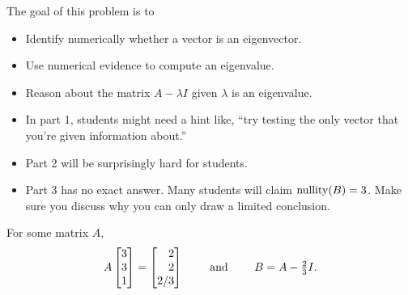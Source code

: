 	\bookonlynewpage
	\question
	\begin{annotation}
		\begin{goals}

			The goal of this problem is to
			\begin{itemize}
				\item Identify numerically whether a vector is an eigenvector.
				\item Use numerical evidence to compute an eigenvalue.
				\item Reason about the matrix $A-\lambda I$ given $\lambda$ is an eigenvalue.
			\end{itemize}
		\end{goals}

		\begin{notes}
			\begin{itemize}
				\item In part 1, students might need a hint like, ``try testing the only vector
					that you're given information about.''
				\item Part 2 will be surprisingly hard for students.
				\item Part 3 has no exact answer. Many students will claim $\operatorname{nullity}(B)=3$.
					Make sure you discuss why you can only draw a limited conclusion.
			\end{itemize}
		\end{notes}
	\end{annotation}
	For some matrix $A$,
	\vspace{-.2cm}
	\[
		A\mat{3\\3\\1}=\mat{2\\2\\2/3}\qquad\text{ and }\qquad B=A-\tfrac{2}{3}I.
	\]
	\vspace{-.4cm}
